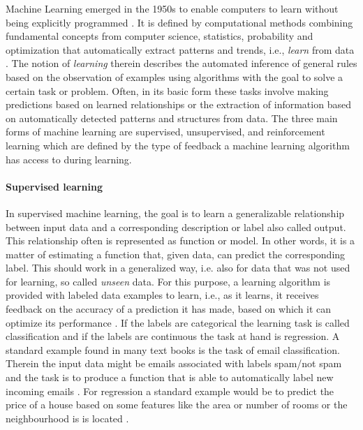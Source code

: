 Machine Learning emerged in the 1950s to enable computers to learn without being explicitly programmed \cite{Samual1959}. It is defined by computational methods combining fundamental concepts from computer science, statistics, probability and optimization that automatically extract patterns and trends, i.e., \textit{learn} from data \cite{Hastie2009}. The notion of \textit{learning} therein describes the automated inference of general rules based on the observation of examples using algorithms with the goal to solve a certain task or problem. Often, in its basic form these tasks involve making predictions based on learned relationships or the extraction of information based on automatically detected patterns and structures from data. The three main forms of machine learning are supervised, unsupervised, and reinforcement learning which are defined by the type of feedback a machine learning algorithm has access to during learning.
\paragraph{Supervised learning}
In supervised machine learning, the goal is to learn a generalizable relationship between input data and a corresponding description or label also called output. This relationship often is represented as function or model. In other words, it is a matter of estimating a function that, given data, can predict the corresponding label. This should work in a generalized way, i.e. also for data that was not used for learning, so called \textit{unseen} data. For this purpose, a learning algorithm is provided with labeled data examples to learn, i.e., as it learns, it receives feedback on the accuracy of a prediction it has made, based on which it can optimize its performance \cite{Russell2015}. If the labels are categorical the learning task is called classification and if the labels are continuous the task at hand is regression. A standard example found in many text books is the task of email classification. Therein the input data might be emails associated with labels spam/not spam and the task is to produce a function that is able to automatically label new incoming emails \cite{Shalev2014}. For regression a standard example would be to predict the price of a house based on some features like the area or number of rooms or the neighbourhood is is located \cite{Ng2022cs229notes}.
